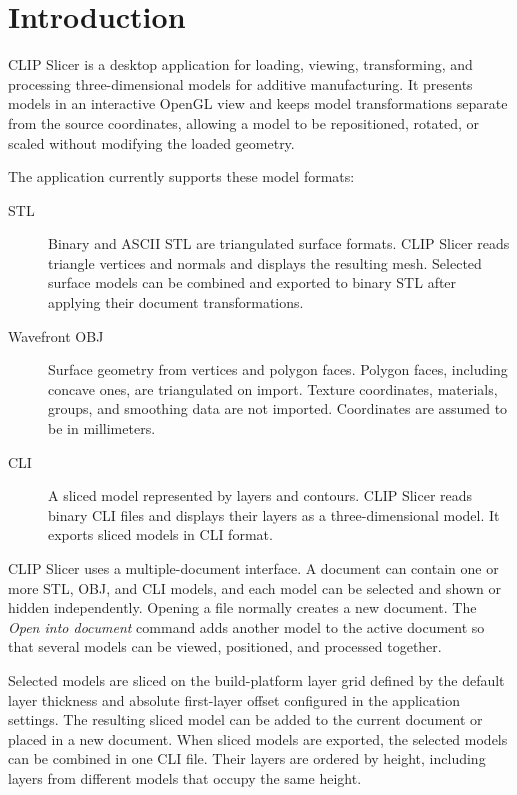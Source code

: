 
\chapter{Introduction}
\label{manual-top}

CLIP Slicer is a desktop application for loading, viewing, transforming, and
processing three-dimensional models for additive manufacturing. It presents
models in an interactive OpenGL view and keeps model transformations separate
from the source coordinates, allowing a model to be repositioned, rotated, or
scaled without modifying the loaded geometry.

The application currently supports these model formats:

\begin{description}
    \item[STL] Binary and ASCII STL are triangulated surface formats. CLIP
        Slicer reads triangle vertices and normals and displays the resulting
        mesh. Selected surface models can be combined and exported to binary
        STL after applying their document transformations.
    \item[Wavefront OBJ] Surface geometry from vertices and polygon faces.
        Polygon faces, including concave ones, are triangulated on import.
        Texture coordinates, materials, groups, and smoothing data are not
        imported. Coordinates are assumed to be in millimeters.
    \item[CLI] A sliced model represented by layers and contours. CLIP Slicer
        reads binary CLI files and displays their layers as a three-dimensional
        model. It exports sliced models in CLI format.
\end{description}

CLIP Slicer uses a multiple-document interface. A document can contain one or
more STL, OBJ, and CLI models, and each model can be selected and shown or hidden
independently. Opening a file normally creates a new document. The
\emph{Open into document} command adds another model to the active document so
that several models can be viewed, positioned, and processed together.

Selected models are sliced on the build-platform layer grid defined by the
default layer thickness and absolute first-layer offset configured in the
application settings. The resulting sliced model can
be added to the current document or placed in a new document. When sliced
models are exported, the selected models can be combined in one CLI file. Their
layers are ordered by height, including layers from different models that
occupy the same height.

